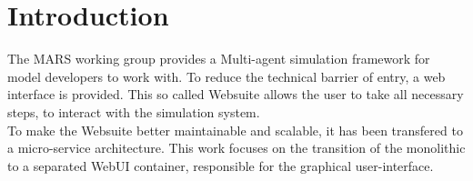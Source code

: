 
\chapter{Introduction}
The MARS working group provides a Multi-agent simulation framework for model developers to work with. To reduce the technical barrier of entry, a web interface is provided. This  so called Websuite allows the user to take all necessary steps, to interact with the simulation system.\\
To make the Websuite better maintainable and scalable, it has been transfered to a micro-service architecture. This work focuses on the transition of the monolithic to a separated WebUI container, responsible for the graphical user-interface.